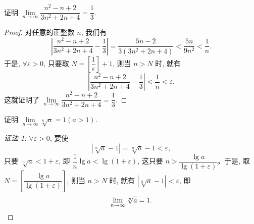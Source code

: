 \begin{example}\label{example:ma-2-1-7}
证明 $\lim\limits_{n\to\infty}\dfrac{n^2-n+2}{3n^2+2n+4}=\dfrac13$.
\end{example}


\begin{proof}
对任意的正整数 $n$, 我们有
\[
  \left|\frac{n^2-n+2}{3n^2+2n+4}-\frac13\right|
  =
  \frac{5n-2}{3(3n^2+2n+4)}
  <
  \frac{5n}{9n^2}
  <
  \frac1n.
\]
于是, $\forall\varepsilon>0$, 只要取 $N=\left[\dfrac1\varepsilon\right]+1$, 则当 $n>N$ 时, 就有
\[
  \left|\frac{n^2-n+2}{3n^2+2n+4}-\frac13\right|
  <
  \frac1n<\varepsilon.
\]
这就证明了 $\lim\limits_{n\to\infty}\dfrac{n^2-n+2}{3n^2+2n+4}=\dfrac13$.
\end{proof}


\begin{example}\label{example:ma-2-1-8}
证明 $\lim\limits_{n\to\infty}\sqrt[n]{a}=1(a>1)$.
\end{example}


\begin{proof}[{证法 1}]
$\forall\varepsilon>0$, 要使
\[
  |\sqrt[n]{a}-1|=\sqrt[n]{a}-1<\varepsilon,
\]
只要 $\sqrt[n]{a}<1+\varepsilon$, 即 $\dfrac1n\lg a<\lg(1+\varepsilon)$, 这只要 $n>\dfrac{\lg a}{\lg(1+\varepsilon)}$。于是, 取 $N=\left[\dfrac{\lg a}{\lg(1+\varepsilon)}\right]$, 则当 $n>N$ 时, 就有 $|\sqrt[n]{a}-1|<\varepsilon$, 即
\[
  \lim_{n\to\infty}\sqrt[n]{a}=1.
\qedhere
\]
\end{proof}


